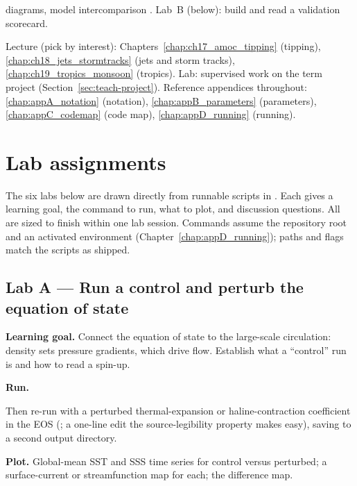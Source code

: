 \begin{description}[leftmargin=0pt,style=nextline]
    diagrams, model intercomparison \citep{eyring2016cmip6}. Lab~B (below): build and read a
    validation scorecard.
  \item[\labweek{13--14} --- Selected phenomena / project work.]
    Lecture (pick by interest): Chapters~\ref{chap:ch17_amoc_tipping} (tipping),
    \ref{chap:ch18_jets_stormtracks} (jets and storm tracks),
    \ref{chap:ch19_tropics_monsoon} (tropics). Lab: supervised work on the term project
    (Section~\ref{sec:teach-project}). Reference appendices throughout:
    \ref{chap:appA_notation} (notation), \ref{chap:appB_parameters} (parameters),
    \ref{chap:appC_codemap} (code map), \ref{chap:appD_running} (running).
\end{description}

\section{Lab assignments}

The six labs below are drawn directly from runnable scripts in . Each gives a
learning goal, the command to run, what to plot, and discussion questions. All are sized to finish
within one lab session. Commands assume the repository root and an activated environment
(Chapter~\ref{chap:appD_running}); paths and flags match the scripts as shipped.

\subsection{Lab A --- Run a control and perturb the equation of state}

\textbf{Learning goal.} Connect the equation of state to the large-scale circulation: density
sets pressure gradients, which drive flow. Establish what a ``control'' run is and how to read a
spin-up.

\textbf{Run.}
\begin{quote}\small
{}
\end{quote}
Then re-run with a perturbed thermal-expansion or haline-contraction coefficient in the EOS
(; a one-line edit the source-legibility property makes easy), saving to
a second output directory.

\textbf{Plot.} Global-mean SST and SSS time series for control versus perturbed; a surface-current
or streamfunction map for each; the difference map.

